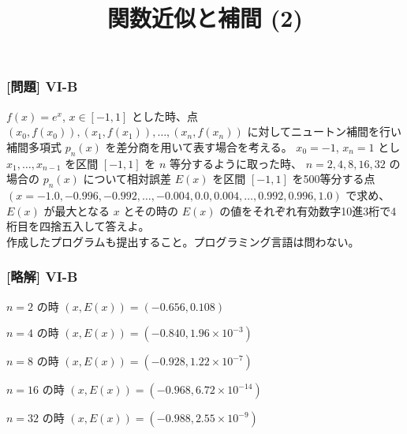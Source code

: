 \documentclass[dvipdfmx,aspectratio=169,20pt]{beamer}
\newcommand{\myfontsetting}[3]{{\fontsize{#1}{#2}\selectfont #3}}
\begin{document}
\begin{frame}
\frametitle{[問題] V\hspace{-.1em}I-B}

\myfontsetting{12pt}{12pt}{
$f(x)=e^x$, $x\in [-1,1]$ とした時、点 $(x_0, f(x_0)), (x_1, f(x_1)), \dots, (x_n, f(x_n))$ に対してニュートン補間を行い補間多項式 $p_n(x)$ を差分商を用いて表す場合を考える。
$x_0 = -1$, $x_n = 1$ とし $x_1, \dots, x_{n-1}$ を区間 $[-1,1]$ を $n$ 等分するように取った時、 $n=2,4,8,16,32$ の場合の $p_n(x)$ について相対誤差 $E(x)$ を区間 $[-1,1]$ を500等分する点 $(x=-1.0, -0.996, -0.992, \dots, -0.004, 0.0, 0.004, \dots, 0.992, 0.996, 1.0)$ で求め、$E(x)$ が最大となる $x$ とその時の $E(x)$ の値をそれぞれ有効数字10進3桁で4桁目を四捨五入して答えよ。
}\\
\myfontsetting{10pt}{10pt}{
作成したプログラムも提出すること。プログラミング言語は問わない。
}
\end{frame}
\begin{frame}
\frametitle{[略解] V\hspace{-.1em}I-B}
$n=2$ の時 $(x,E(x))=(-0.656, 0.108)$

$n=4$ の時 $(x,E(x))=(-0.840,1.96\times 10^{-3})$

$n=8$ の時 $(x,E(x))=(-0.928, 1.22\times 10^{-7})$

$n=16$ の時 $(x,E(x))=(-0.968, 6.72\times 10^{-14})$

$n=32$ の時 $(x,E(x))=(-0.988, 2.55\times 10^{-9})$

\end{frame}

\title{関数近似と補間 (2)}

\end{document}

